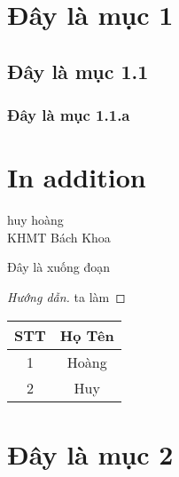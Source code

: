 \documentclass[12pt]{article}
\title{}
\author{}
\begin{document}
	\tableofcontents    				%

\section{Đây là mục 1}    				%
\subsection{Đây là mục 1.1}             %
\subsubsection{Đây là mục 1.1.a}
\section*{In addition}               	%

huy hoàng  \\           				%
KHMT Bách Khoa

Đây là xuống đoạn 						%

\begin{proof}[Hướng dẫn]    			%
	ta làm
\end{proof}


\newpage




\begin{center}
	\begin{tabular}{|c|c|}
		\hline
		STT & Họ Tên \\
		\hline
		1 & Hoàng \\
		\hline
		2 & Huy \\
		\hline
	\end{tabular}	\newpage
	
\end{center}








\section{Đây là mục 2}  				%
\end{document}
